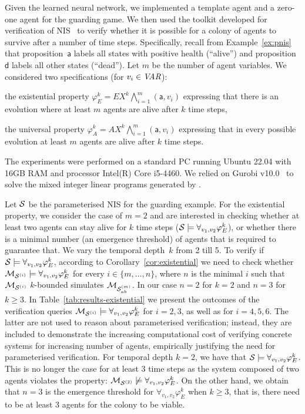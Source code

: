 Given the learned neural network, we implemented a template agent and a
zero-one agent for the guarding game. We then used the \venmas toolkit
developed for verification of NIS~\cite{Akintunde+20b} to verify whether it is
possible for a colony of agents to survive after a number of time steps.
%
Specifically, recall from Example~\ref{ex:pnis} that proposition~$\mathsf{a}$
labels all states with positive health (``alive'') and proposition $\mathsf{d}$
labels all other states (``dead'').
%
Let $m$ be the number of agent variables. We considered two
specifications (for $v_i \in\it{VAR}$):
\begin{inparaenum}[\it (i)]
\item the existential property
  $\varphi^k_E = EX^k \bigwedge_{i=1}^m(\mathsf{a},v_i)$ 
  expressing that there is an evolution where at least $m$ agents are alive after
  $k$ time steps,
\item the universal property $\varphi^k_A = AX^k \bigwedge_{i=1}^m(\mathsf{a},v_i)$
  expressing that in every possible evolution at least $m$ agents are alive
  after $k$ time steps.
\end{inparaenum}
%
The experiments %
were performed on a standard PC running Ubuntu 22.04 with 16GB RAM and
processor Intel(R) Core i5-4460. We relied on Gurobi
v10.0~\cite{Gurobi+16a} to solve the mixed integer linear programs generated by
\venmas.

%
Let $\mathcal S$ be the parameterised NIS for the guarding example. For the
existential property, we consider the case of $m=2$ and are interested in
checking whether at least two agents can stay alive for $k$ time steps
($\mathcal S\models\forall_{v_1,v_2}\varphi^k_E$), or whether there is a minimal
number (an emergence threshold) of agents that is required to guarantee
that. We vary the temporal depth~$k$ from 2 till 5.  To verify if
$\mathcal S\models\forall_{v_1,v_2}\varphi^k_E$, according to
Corollary~\ref{cor:existential} we need to check whether
$\mathcal{M}_{\mathcal{S}^{(i)}}\models\forall_{v_1,v_2}\varphi^k_E$ for every $i\in\{m,\dots,n\}$,
where $n$ is the minimal $i$ such that $\mathcal{M}_{\mathcal{S}^{(i)}}$ $k$-bounded simulates
$\mathcal{M}_{\mathcal{S}_{ab}^{(m)}}$. In our case $n=2$ for $k=2$ and $n=3$ for $k\geq 3$.  In
Table~\ref{tab:results-existential} we present the outcomes of the verification
queries $\mathcal{M}_{\mathcal{S}^{(i)}}\models\forall_{v_1,v_2}\varphi^k_E$ for $i=2,3$, as well as
for $i=4,5,6$. The latter are not used to reason about parameterised
verification; instead, they are included to demonstrate the increasing
computational cost of verifying concrete systems for increasing number of
agents, empirically justifying the need for parameterised verification.
%
For temporal depth $k=2$, we have that
$\mathcal S\models\forall_{v_1,v_2}\varphi^k_E$. This is no longer the case for at
least 3 time steps as the system composed of two agents violates the property:
$\mathcal{M}_{\mathcal{S}^{(2)}}\not\models\forall_{v_1,v_2}\varphi^k_E$. On the other hand, we obtain
that $n=3$ is the emergence threshold for $\forall_{v_1,v_2}\varphi^k_E$ when
$k\geq 3$, that is, there need to be at least 3 agents for the colony to be
viable.

